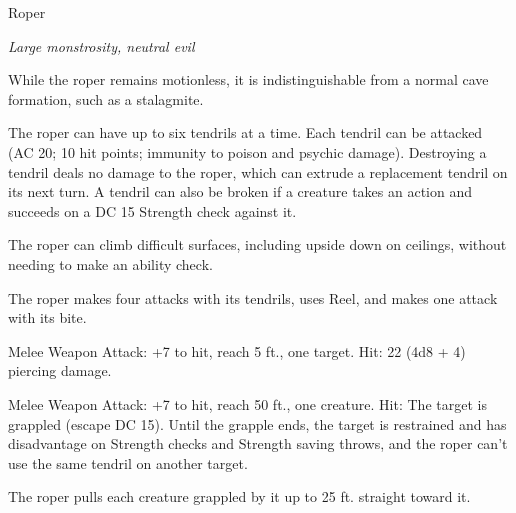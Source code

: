 \begin{monsterbox}{Roper}
\begin{hangingpar}
\textit{Large monstrosity, neutral evil}
\end{hangingpar}
\dndline%
\basics[%
armorclass = 20,
hitpoints = 11d10 + 33,
speed = {10 ft., climb 10 ft.}
]
\dndline%
\stats[%
STR = \stat{18},
DEX = \stat{8},
CON = \stat{17},
INT = \stat{7},
WIS = \stat{16},
CHA = \stat{6}
]
\dndline%
\details[%
skills={Stealth +5, Perception +6, },
damageimmunities={},
savingthrows={},
conditionimmunities={},
damageresistances={},
damagevulnerabilities={},
senses={darkvision 60 ft., passive Perception 16},
challenge=5
]
\dndline%
\begin{monsteraction}
While the roper remains motionless, it is indistinguishable from a normal cave formation, such as a stalagmite.
\end{monsteraction}
\begin{monsteraction}
The roper can have up to six tendrils at a time. Each tendril can be attacked (AC 20; 10 hit points; immunity to poison and psychic damage). Destroying a tendril deals no damage to the roper, which can extrude a replacement tendril on its next turn. A tendril can also be broken if a creature takes an action and succeeds on a DC 15 Strength check against it.
\end{monsteraction}
\begin{monsteraction}
The roper can climb difficult surfaces, including upside down on ceilings, without needing to make an ability check.
\end{monsteraction}
\begin{monsteraction}[Multiattack]
The roper makes four attacks with its tendrils, uses Reel, and makes one attack with its bite.
\end{monsteraction}
\begin{monsteraction}[Bite]
Melee Weapon Attack: +7 to hit, reach 5 ft., one target. Hit: 22 (4d8 + 4) piercing damage.
\end{monsteraction}
\begin{monsteraction}[Tendril]
Melee Weapon Attack: +7 to hit, reach 50 ft., one creature. Hit: The target is grappled (escape DC 15). Until the grapple ends, the target is restrained and has disadvantage on Strength checks and Strength saving throws, and the roper can't use the same tendril on another target.
\end{monsteraction}
\begin{monsteraction}[Reel]
The roper pulls each creature grappled by it up to 25 ft. straight toward it.
\end{monsteraction}
\end{monsterbox}